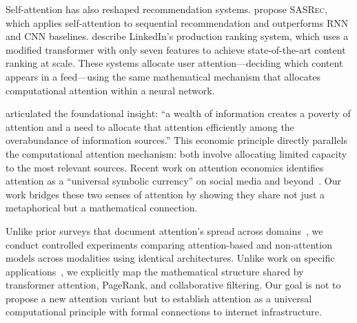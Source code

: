 Self-attention has also reshaped recommendation systems. \citet{kang2018self} propose \textsc{SASRec}, which applies self-attention to sequential recommendation and outperforms RNN and CNN baselines. \citet{linkedin2025ranking} describe LinkedIn's production ranking system, which uses a modified transformer with only seven features to achieve state-of-the-art content ranking at scale. These systems allocate user attention---deciding which content appears in a feed---using the same mathematical mechanism that allocates computational attention within a neural network.

\citet{simon1971designing} articulated the foundational insight: ``a wealth of information creates a poverty of attention and a need to allocate that attention efficiently among the overabundance of information sources.'' This economic principle directly parallels the computational attention mechanism: both involve allocating limited capacity to the most relevant sources. Recent work on attention economics identifies attention as a ``universal symbolic currency'' on social media and beyond~\citep{davenport2001attention}. Our work bridges these two senses of attention by showing they share not just a metaphorical but a mathematical connection.

Unlike prior surveys that document attention's spread across domains~\citep{brauwers2022survey,guo2022attention}, we conduct controlled experiments comparing attention-based and non-attention models across modalities using identical architectures. Unlike work on specific applications~\citep{kang2018self,velickovic2018graph}, we explicitly map the mathematical structure shared by transformer attention, PageRank, and collaborative filtering. Our goal is not to propose a new attention variant but to establish attention as a universal computational principle with formal connections to internet infrastructure.
